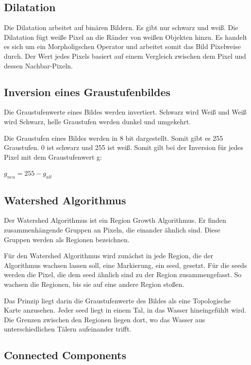 \documentclass[german,a4paper, 12pt]{llncs}
\begin{document}
\subsection{Dilatation}
Die Dilatation arbeitet auf binären Bildern. Es gibt nur schwarz und weiß.
Die Dilatation fügt weiße Pixel an die Ränder von weißen Objekten hinzu. 
Es handelt es sich um ein Morpholigschen Operator und arbeitet somit das Bild Pixelweise durch. Der Wert jedes Pixels basiert auf einem Vergleich zwischen dem Pixel und dessen Nachbar-Pixeln.\cite{DilationCV}
	
\subsection{Inversion eines Graustufenbildes}

Die Graustufenwerte eines Bildes werden invertiert. 
Schwarz wird Weiß und Weiß wird Schwarz, helle Graustufen werden dunkel und umgekehrt.
 
Die Graustufen eines Bildes werden in 8 bit dargestellt. Somit gibt es 255 Graustufen. 0 ist schwarz und 255 ist weiß. 
Somit gilt bei der Inversion für jedes Pixel mit dem Graustufenwert g:

$g_{neu} = 255- g_{alt} $

\subsection{Watershed Algorithmus}

Der Watershed Algorithmus ist ein Region Growth Algorithmus. Er finden zusammenhängende Gruppen an Pixeln, die einander ähnlich sind. Diese Gruppen werden als Regionen bezeichnen. 

Für den Watershed Algorithmus wird zunächst in jede Region, die der Algorithmus wachsen lassen soll, eine Markierung, ein seed, gesetzt. Für die seeds werden die Pixel, die dem seed ähnlich sind zu der Region zusammengefasst. So wachsen die Regionen, bis sie auf eine andere Region stoßen.\cite{Watershed,WatershedCV}

Das Prinzip liegt darin die Graustufenwerte des Bildes als eine Topologische Karte anzusehen. Jeder seed liegt in einem Tal, in das Wasser hineingefühlt wird. Die Grenzen zwischen den Regionen liegen dort, wo das Wasser aus unterschiedlichen Tälern aufeinander trifft.\cite{Watershed,WatershedCV} 

\subsection{Connected Components}
\end{document}
